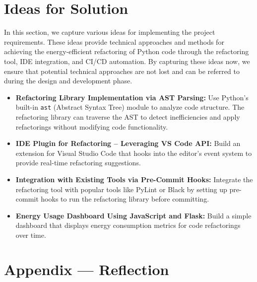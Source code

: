 \documentclass[12pt]{article}
\begin{document}
\section{Ideas for Solution}
In this section, we capture various ideas for implementing the project requirements. These ideas provide technical approaches and methods for achieving the energy-efficient refactoring of Python code through the refactoring tool, IDE integration, and CI/CD automation. By capturing these ideas now, we ensure that potential technical approaches are not lost and can be referred to during the design and development phase.
\begin{itemize}
    \item \textbf{Refactoring Library Implementation via AST Parsing:} 
    Use Python’s built-in \texttt{ast} (Abstract Syntax Tree) module to analyze code structure. The refactoring library can traverse the AST to detect inefficiencies and apply refactorings without modifying code functionality.
    \item \textbf{IDE Plugin for Refactoring – Leveraging VS Code API:} 
    Build an extension for Visual Studio Code that hooks into the editor’s event system to provide real-time refactoring suggestions.
    \item \textbf{Integration with Existing Tools via Pre-Commit Hooks:} 
    Integrate the refactoring tool with popular tools like PyLint or Black by setting up pre-commit hooks to run the refactoring library before committing.
    \item \textbf{Energy Usage Dashboard Using JavaScript and Flask:} 
    Build a simple dashboard that displays energy consumption metrics for code refactorings over time.
\end{itemize}



\newpage{}
\section*{Appendix --- Reflection}
\end{document}
